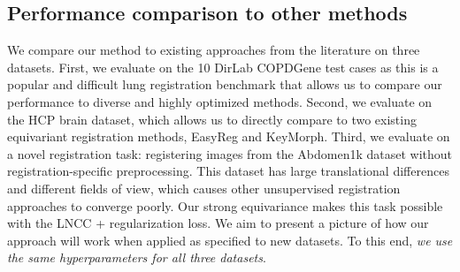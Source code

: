 
\subsection{Performance comparison to other methods}
We compare our method to existing approaches from the literature on three datasets. First, we
evaluate on the 10 DirLab COPDGene test cases as this is a popular and
difficult lung registration benchmark that allows us to compare our performance to
diverse and highly optimized methods. Second, we evaluate on the HCP brain
dataset, which allows us to directly compare to two existing equivariant
registration methods, EasyReg and KeyMorph. Third, we evaluate on a novel
registration task: registering images from the Abdomen1k dataset without
registration-specific preprocessing. This dataset has large translational
differences and different fields of view, which causes other unsupervised
registration approaches to converge poorly. Our strong equivariance makes this
task possible with the LNCC + regularization loss. We aim to present a picture of how our approach will work when applied as specified to new datasets. To this end, \emph{we use the same hyperparameters for all three datasets}.


